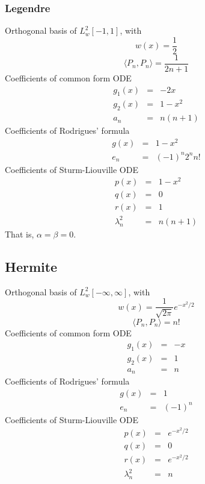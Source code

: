 \documentclass[11pt]{article}
\begin{document}
\subsubsection{Legendre}
Orthogonal basis of $L^2_w[-1,1]$, with
\[w(x) = \frac{1}{2}\] 
\[\langle P_n,P_n\rangle = \frac{1}{2n+1}\]
Coefficients of common form ODE
\begin{eqnarray*}
g_1(x) &=& -2x\\
g_2(x) &=& 1 - x^2\\
a_n &=& n(n+1)
\end{eqnarray*}
Coefficients of Rodrigues' formula
 \begin{eqnarray*}
g(x) &=& 1 - x^2\\
e_n &=& (-1)^n2^nn!
\end{eqnarray*}
Coefficients of Sturm-Liouville ODE
\begin{eqnarray*}
p(x) &=& 1 - x^2\\
q(x) &=& 0\\
r(x) &=& 1\\
\lambda^2_n &=& n(n+1)
\end{eqnarray*}
That is, $\alpha = \beta = 0$.
\subsection{Hermite}
Orthogonal basis of $L^2_w[-\infty,\infty]$, with
\[w(x) = \frac{1}{\sqrt{2\pi}}e^{-x^2/2}\] 
\[\langle P_n,P_n\rangle = n!\]
Coefficients of common form ODE
\begin{eqnarray*}
g_1(x) &=& -x\\
g_2(x) &=& 1\\
a_n &=& n
\end{eqnarray*}
Coefficients of Rodrigues' formula
 \begin{eqnarray*}
g(x) &=& 1 \\
e_n &=& (-1)^n
\end{eqnarray*}
Coefficients of Sturm-Liouville ODE
\begin{eqnarray*}
p(x) &=& e^{-x^2/2}\\
q(x) &=& 0\\
r(x) &=& e^{-x^2/2}\\
\lambda^2_n &=& n
\end{eqnarray*}

\end{document}
